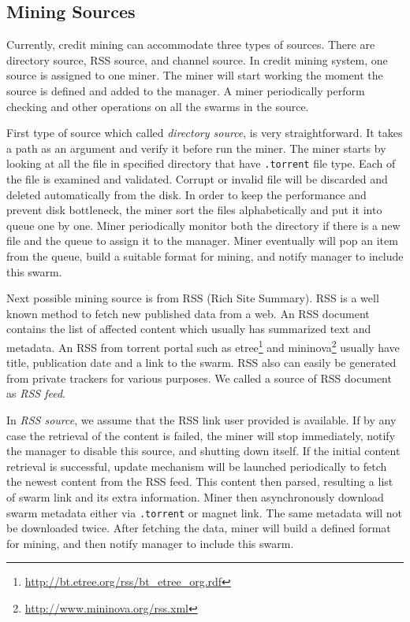 
\subsection{Mining Sources}
\label{section:msource} 
Currently, credit mining can accommodate three types of sources. There are directory source, RSS source, and channel source. In credit mining system, one source is assigned to one miner. The miner will start working the moment the source is defined and added to the manager. A miner periodically perform checking and other operations on all the swarms in the source.

First type of source which called \textit{directory source}, is very straightforward. It takes a path as an argument and verify it before run the miner. The miner starts by looking at all the file in specified directory that have \texttt{.torrent} file type. Each of the file is examined and validated. Corrupt or invalid file will be discarded and deleted automatically from the disk. In order to keep the performance and prevent disk bottleneck, the miner sort the files alphabetically and put it into queue one by one. Miner periodically monitor both the directory if there is a new file and the queue to assign it to the manager. Miner eventually will pop an item from the queue, build a suitable format for mining, and notify manager to include this swarm.

Next possible mining source is from RSS (Rich Site Summary). RSS is a well known method to fetch new published data from a web. An RSS document contains the list of affected content which usually has summarized text and metadata. An RSS from torrent portal such as etree\footnote{\url{http://bt.etree.org/rss/bt_etree_org.rdf}} and mininova\footnote{\url{http://www.mininova.org/rss.xml}} usually have title, publication date and a link to the swarm. RSS also can easily be generated from private trackers for various purposes. We called a source of RSS document as \textit{RSS feed}. 

In \textit{RSS source}, we assume that the RSS link user provided is available. If by any case the retrieval of the content is failed, the miner will stop immediately, notify the manager to disable this source, and shutting down itself. If the initial content retrieval is successful, update mechanism will be launched periodically to fetch the newest content from the RSS feed. This content then parsed, resulting a list of swarm link and its extra information. Miner then asynchronously download swarm metadata either via \texttt{.torrent} or magnet link. The same metadata will not be downloaded twice. After fetching the data, miner will build a defined format for mining, and then notify manager to include this swarm. 

